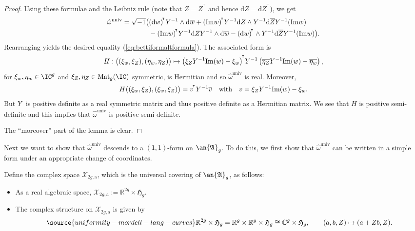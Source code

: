 \begin{proof}
Using these formulae
and the Leibniz rule (note that $Z = Z^{\!^{\intercal}}$ and hence $\mathrm{d}Z = \mathrm{d}Z^{\!^{\intercal}}$), we get
\begin{align*}
    \hat\omega^{\mathrm{univ}} = \sqrt{-1} \big( &
 (\mathrm{d}w)^{\!^{\intercal}} Y^{-1} \wedge  \mathrm{d}\overline{w} + (\mathrm{Im}w)^{\!^{\intercal}} Y^{-1}  \mathrm{d}Z \wedge Y^{-1}  \mathrm{d}\overline{Z}  Y^{-1} (\mathrm{Im}w) \\
 & - (\mathrm{Im}w)^{\!^{\intercal}} Y^{-1} \mathrm{d}Z
 Y^{-1} \wedge  \mathrm{d}\overline{w} -
 (\mathrm{d}w)^{\!^{\intercal}}   \wedge Y^{-1}  \mathrm{d}\overline{Z} Y^{-1} (\mathrm{Im}w) \big).
\end{align*}
  Rearranging yields the desired equality (\ref{eq:bettiformaltformula}).
  The associated  form is
  \begin{equation*}
    H:\bigl((\xi_w,\xi_Z),(\eta_w,\eta_Z)\bigr) \mapsto
    {{\left( \xi_Z Y^{-1}
        \mathrm{Im}(w) - \xi_w\right)}}^{\!^{\intercal}}  Y^{-1} \left( \overline{\eta_Z} Y^{-1}
      \mathrm{Im}(w) -  \overline{\eta_w}\right),
  \end{equation*}
  for $\xi_w,\eta_w \in \IC^g$ and $\xi_Z,\eta_Z\in
  \mathrm{Mat}_g(\IC)$ symmetric, is Hermitian and so
  $\hat \omega^{\mathrm{univ}}$ is real. Moreover,
    \begin{equation*}
    H\bigl((\xi_w,\xi_Z),(\xi_w,\xi_Z)\bigr) = {{v}}^{\!^{\intercal}} Y^{-1} \overline v
    \quad\text{with}\quad v =  \xi_Z Y^{-1}
        \mathrm{Im}(w) - \xi_w.
  \end{equation*}
  But $Y$ is positive definite as a real symmetric matrix and thus
  positive definite as a Hermitian matrix. We see that $H$
  is positive semi-definite and this implies that
  $\hat\omega^{\mathrm{univ}}$ is positive semi-definite.

  The ``moreover'' part of the lemma is clear.
\end{proof}

Next we want to show that $\hat{\omega}^{\mathrm{univ}}$ descends to a $(1,1)$-form on $\an{\mathfrak{A}}_g$. To do this, we first show that $\hat{\omega}^{\mathrm{univ}}$ can be written in a simple form under an appropriate change of coordinates.

Define the complex space $\mathcal X_{2g,\mathrm{a}}$, which is the universal covering of $\an{\mathfrak{A}}_g$, as follows:
\begin{itemize}
\item As a real algebraic space, $\mathcal X_{2g,\mathrm{a}} := \mathbb R^{2g} \times \mathfrak{H}_g$.
\item The complex structure on $\mathcal X_{2g,\mathrm{a}}$ is given by
\begin{equation}\label{EqChangeOfCoor}
\source{uniformity-mordell-lang-curves}
\mathbb R^{2g} \times \mathfrak{H}_g = \mathbb R^g \times \mathbb R^g \times \mathfrak{H}_g \cong \mathbb C^g \times \mathfrak{H}_g, \qquad (a,b,Z) \mapsto (a+Zb, Z).
\end{equation}
\end{itemize}


